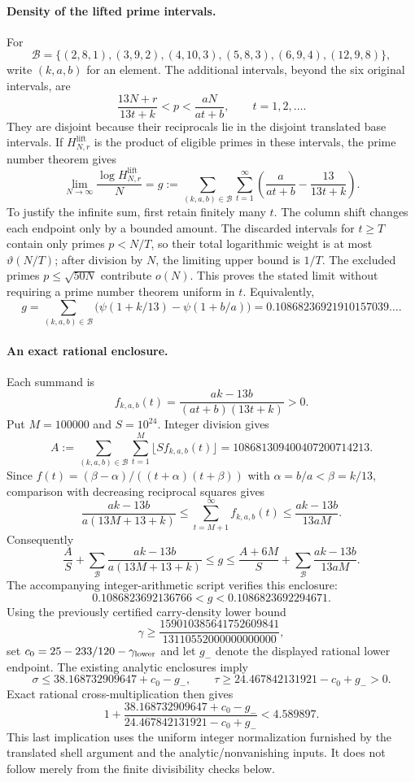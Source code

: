 \documentclass[11pt]{article}
\begin{document}
\paragraph{Density of the lifted prime intervals.}
For
\[
 \mathcal B=\{(2,8,1),(3,9,2),(4,10,3),
                 (5,8,3),(6,9,4),(12,9,8)\},
\]
write $(k,a,b)$ for an element. The additional intervals, beyond the six
original intervals, are
\[
 \frac{13N+r}{13t+k}<p<\frac{aN}{at+b},\qquad t=1,2,\ldots .
\]
They are disjoint because their reciprocals lie in the disjoint translated
base intervals. If $H_{N,r}^{\mathrm{lift}}$ is the product of eligible primes
in these intervals, the prime number theorem gives
\[
 \lim_{N\to\infty}\frac{\log H_{N,r}^{\mathrm{lift}}}{N}
 =g:=\sum_{(k,a,b)\in\mathcal B}\sum_{t=1}^{\infty}
       \left(\frac{a}{at+b}-\frac{13}{13t+k}\right).
\]
To justify the infinite sum, first retain finitely many $t$. The column
shift changes each endpoint only by a bounded amount. The discarded
intervals for $t\ge T$ contain only primes $p<N/T$, so their total
logarithmic weight is at most $\vartheta(N/T)$; after division by $N$,
the limiting upper bound is $1/T$. The excluded primes
$p\le\sqrt{50N}$ contribute $o(N)$. This proves the stated limit without
requiring a prime number theorem uniform in $t$.
Equivalently,
\[
 g=\sum_{(k,a,b)\in\mathcal B}
       \bigl(\psi(1+k/13)-\psi(1+b/a)\bigr)
  =0.10868236921910157039\ldots.
\]

\paragraph{An exact rational enclosure.}
Each summand is
\[
 f_{k,a,b}(t)=\frac{ak-13b}{(at+b)(13t+k)}>0.
\]
Put $M=100000$ and $S=10^{24}$. Integer division gives
\[
 A:=\sum_{(k,a,b)\in\mathcal B}\sum_{t=1}^{M}
          \lfloor S f_{k,a,b}(t)\rfloor
   =108681309400407200714213.
\]
Since $f(t)=(\beta-\alpha)/((t+\alpha)(t+\beta))$ with
$\alpha=b/a<\beta=k/13$, comparison with decreasing reciprocal squares gives
\[
 \frac{ak-13b}{a(13M+13+k)}
 \le \sum_{t=M+1}^{\infty}f_{k,a,b}(t)
 \le \frac{ak-13b}{13aM}.
\]
Consequently
\[
 \frac AS+\sum_{\mathcal B}\frac{ak-13b}{a(13M+13+k)}
 \le g\le
 \frac{A+6M}{S}+\sum_{\mathcal B}\frac{ak-13b}{13aM}.
\]
The accompanying integer-arithmetic script verifies this enclosure:
\[
 0.1086823692136766<g<0.1086823692294671.
\]
Using the previously certified carry-density lower bound
\[
 \gamma\ge\frac{159010385641752609841}{13110552000000000000},
\]
set $c_0=25-233/120-\gamma_{\rm lower}$ and let $g_-$ denote the displayed
rational lower endpoint. The existing analytic enclosures imply
\[
 \sigma\le38.168732909647+c_0-g_-,\qquad
 \tau\ge24.467842131921-c_0+g_->0.
\]
Exact rational cross-multiplication then gives
\[
 1+\frac{38.168732909647+c_0-g_-}
          {24.467842131921-c_0+g_-}
   <4.589897.
\]
This last implication uses the uniform integer normalization furnished by
the translated shell argument and the analytic/nonvanishing inputs.
It does not follow merely from the finite divisibility checks below.
\end{document}
